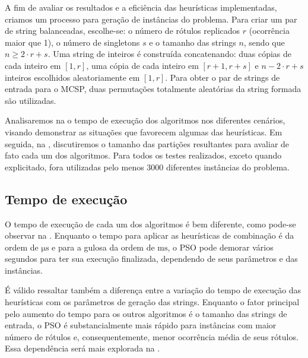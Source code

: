 A fim de avaliar os resultados e a eficiência das heurísticas implementadas, criamos um processo para geração de instâncias do problema. Para criar um par de string balanceadas, escolhe-se: o número de rótulos replicados $r$ (ocorrência maior que 1), o número de singletons $s$ e o tamanho das strings $n$, sendo que $n \ge 2 \cdot r + s$. Uma string de inteiros é construída concatenando: duas cópias de cada inteiro em $[1, r]$, uma cópia de cada inteiro em $[r + 1, r + s]$ e $n - 2 \cdot r + s$ inteiros escolhidos aleatoriamente em $[1, r]$. Para obter o par de strings de entrada para o MCSP, duas permutações totalmente aleatórias da string formada são utilizadas.

Analisaremos na  o tempo de execução dos algoritmos nos diferentes cenários, visando demonstrar as situações que favorecem algumas das heurísticas. Em seguida, na , discutiremos o tamanho das partições resultantes para avaliar de fato cada um dos algoritmos. Para todos os testes realizados, exceto quando explicitado, fora utilizadas pelo menos 3000 diferentes instâncias do problema.

\subsection{Tempo de execução} \label{sec:resultados-tempo}

    O tempo de execução de cada um dos algoritmos é bem diferente, como pode-se observar na . Enquanto o tempo para aplicar as heurísticas de combinação é da ordem de $\unit{\micro\second}$ e para a gulosa da ordem de $\unit{\milli\second}$, o PSO pode demorar vários segundos para ter sua execução finalizada, dependendo de seus parâmetros e das instâncias.

    É válido ressaltar também a diferença entre a variação do tempo de execução das heurísticas com os parâmetros de geração das strings. Enquanto o fator principal pelo aumento do tempo para os outros algoritmos é o tamanho das strings de entrada, o PSO é substancialmente mais rápido para instâncias com maior número de rótulos e, consequentemente, menor ocorrência média de seus rótulos. Essa dependência será mais explorada na .

